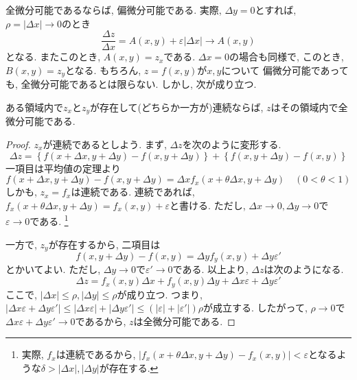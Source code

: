         全微分可能であるならば, 偏微分可能である. 実際, $\Delta y=0$とすれば, $\rho=|\Delta x|\to 0$のとき
        \begin{equation*}
            \frac{\Delta z}{\Delta x}=A(x,y)+\varepsilon|\Delta x|\to A(x,y)
        \end{equation*}
        となる. またこのとき, $A(x,y)=z_x$である. $\Delta x=0$の場合も同様で, このとき, $B(x,y)=z_y$となる. もちろん, $z=f(x,y)$が$x,y$について
        偏微分可能であっても, 全微分可能であるとは限らない. しかし, 次が成り立つ.
        \begin{screen}
            ある領域内で$z_{x}$と$z_{y}$が存在して(どちらか一方が)連続ならば, $z$はその領域内で全微分可能である.
        \end{screen}
        \begin{proof}
            $z_{x}$が連続であるとしよう. まず, $\Delta z$を次のように変形する.
            \begin{equation*}
                \Delta z = \left\{f(x+\Delta x,y+\Delta y)-f(x,y+\Delta y)\right\}+\left\{f(x,y+\Delta y)-f(x,y)\right\}
            \end{equation*}
            一項目は平均値の定理より
            \begin{equation*}
                f(x+\Delta x,y+\Delta y)-f(x,y+\Delta y)=\Delta xf_{x}(x+\theta\Delta x,y+\Delta y) \quad (0<\theta<1)
            \end{equation*}
            しかも, $z_{x}=f_x$は連続である. 連続であれば, $f_x(x+\theta\Delta x,y+\Delta y)=f_{x}(x,y)+\varepsilon$と書ける. ただし, $\Delta x\to 0,\Delta y\to 0$で$\varepsilon\to 0$である.
            \footnote{実際, $f_{x}$は連続であるから, $|f_{x}(x+\theta\Delta x,y+\Delta y)-f_{x}(x,y)|<\varepsilon$となるような$\delta>|\Delta x|,|\Delta y|$が存在する.}

            一方で, $z_y$が存在するから, 二項目は
            \begin{equation*}
                f(x,y+\Delta y)-f(x,y)=\Delta yf_y(x,y)+\Delta y\varepsilon'
            \end{equation*}
            とかいてよい. ただし, $\Delta y\to 0$で$\varepsilon'\to 0$である. 以上より, $\Delta z$は次のようになる.
            \begin{equation*}
                \Delta z= f_{x}(x,y)\Delta x +f_{y}(x,y)\Delta y + \Delta x \varepsilon+\Delta y\varepsilon'
            \end{equation*}
            ここで, $|\Delta x|\leq\rho,|\Delta y|\leq\rho$が成り立つ. つまり, $|\Delta x\varepsilon+\Delta y\varepsilon'|\leq |\Delta x\varepsilon|+|\Delta y\varepsilon'|\leq(|\varepsilon|+|\varepsilon'|)\rho$が成立する. 
            したがって, $\rho\to 0$で$\Delta x\varepsilon+\Delta y\varepsilon'\to 0$であるから, $z$は全微分可能である.
        \end{proof}
